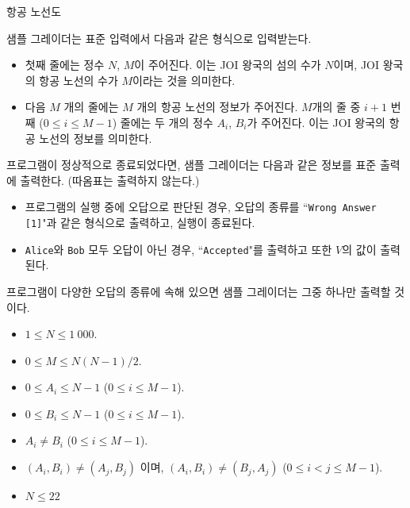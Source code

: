 \begin{problem}{항공 노선도}
\InputFile

샘플 그레이더는 표준 입력에서 다음과 같은 형식으로 입력받는다.

\begin{itemize}
	\item 첫째 줄에는 정수 $N$, $M$이 주어진다. 이는 JOI 왕국의 섬의 수가 $N$이며, JOI 왕국의 항공 노선의 수가 $M$이라는 것을 의미한다.
	\item 다음 $M$ 개의 줄에는 $M$ 개의 항공 노선의 정보가 주어진다. $M$개의 줄 중 $i+1$ 번째 ($0 \le i \le M-1$) 줄에는 두 개의 정수 $A_i$, $B_i$가 주어진다. 이는 JOI 왕국의 항공 노선의 정보를 의미한다.
\end{itemize}

\OutputFile

프로그램이 정상적으로 종료되었다면, 샘플 그레이더는 다음과 같은 정보를 표준 출력에 출력한다. (따옴표는 출력하지 않는다.)

\begin{itemize}
	\item 프로그램의 실행 중에 오답으로 판단된 경우, 오답의 종류를 ``\texttt{Wrong Answer [1]}"과 같은 형식으로 출력하고, 실행이 종료된다.
	
	\item \texttt{Alice}와 \texttt{Bob} 모두 오답이 아닌 경우, ``\texttt{Accepted}"를 출력하고 또한 $V$의 값이 출력된다.

\end{itemize}

프로그램이 다양한 오답의 종류에 속해 있으면 샘플 그레이더는 그중 하나만 출력할 것이다.

\Constraints

\begin{itemize}
	\item $1 \le N \le 1\ 000$.
	\item $0 \le M \le N(N-1)/2$.
	\item $0 \le A_i \le N-1$ ($0 \le i \le M-1$).
	\item $0 \le B_i \le N-1$ ($0 \le i \le M-1$).
	\item $A_i \ne B_i$ ($0 \le i \le M-1$).
	\item $(A_i,B_i) \ne (A_j, B_j)$ 이며, $(A_i, B_i) \ne (B_j, A_j)$ ($0 \le  i < j \le M-1$).
\end{itemize}




\begin{itemize}
	\item $N \le 22$
\end{itemize}


\end{problem}
